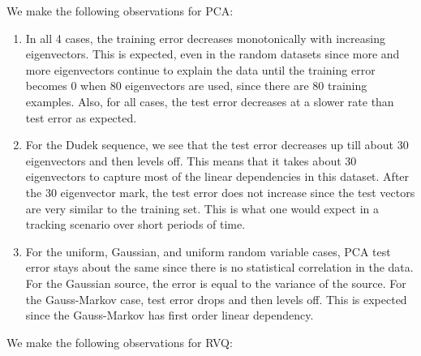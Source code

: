 We make the following observations for PCA:
\begin{enumerate}
\item In all 4 cases, the training error decreases monotonically with increasing eigenvectors.  This is expected, even in the random datasets since more and more eigenvectors continue to explain the data until the training error becomes 0 when 80 eigenvectors are used, since there are 80 training examples.  Also, for all cases, the test error decreases at a slower rate than test error as expected. 

\item For the Dudek sequence, we see that the test error decreases up till about 30 eigenvectors and then levels off.  This means that it takes about 30 eigenvectors to capture most of the linear dependencies in this dataset.  After the 30 eigenvector mark, the test error does not increase since the test vectors are very similar to the training set.  This is what one would expect in a tracking scenario over short periods of time.  

\item For the uniform, Gaussian, and uniform random variable cases, PCA test error stays about the same since there is no statistical correlation in the data.  For the Gaussian source, the error is equal to the variance of the source.  For the Gauss-Markov case, test error drops and then levels off.  This is expected since the Gauss-Markov has first order linear dependency.

\end{enumerate}


We make the following observations for RVQ:

